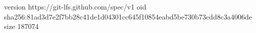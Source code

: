 version https://git-lfs.github.com/spec/v1
oid sha256:81ad3d7e2f7bb28c41de1d04301cc645f10854eabd5be730b73cdd8c3a4006de
size 187074
